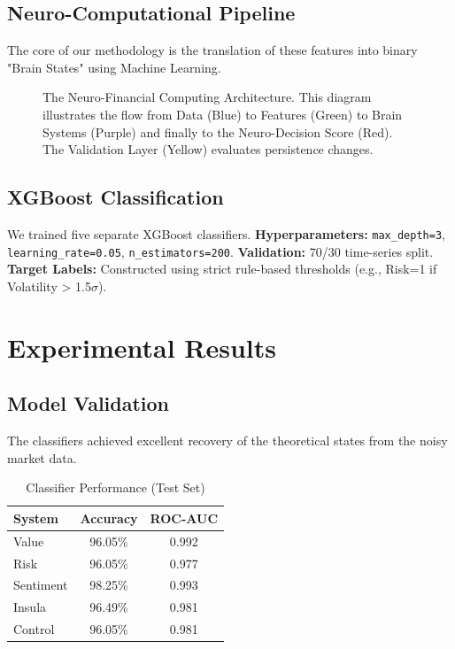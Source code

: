 \documentclass[12pt, oneside]{article}
\begin{document}
\subsection{Neuro-Computational Pipeline}
The core of our methodology is the translation of these features into binary "Brain States" using Machine Learning.

\begin{figure}[H]
\centering
\resizebox{0.9\textwidth}{!}{%
    
}
\caption{The Neuro-Financial Computing Architecture. This diagram illustrates the flow from Data (Blue) to Features (Green) to Brain Systems (Purple) and finally to the Neuro-Decision Score (Red). The Validation Layer (Yellow) evaluates persistence changes.}
\label{fig:architecture}
\end{figure}

\subsection{XGBoost Classification}
We trained five separate XGBoost classifiers.
\textbf{Hyperparameters:} \texttt{max\_depth=3}, \texttt{learning\_rate=0.05}, \texttt{n\_estimators=200}.
\textbf{Validation:} 70/30 time-series split.
\textbf{Target Labels:} Constructed using strict rule-based thresholds (e.g., Risk=1 if Volatility > 1.5$\sigma$).

\section{Experimental Results}

\subsection{Model Validation}
The classifiers achieved excellent recovery of the theoretical states from the noisy market data.
\begin{table}[H]
\centering
\caption{Classifier Performance (Test Set)}
\label{tab:performance}
\begin{tabular}{lcc}
\toprule
\textbf{System} & \textbf{Accuracy} & \textbf{ROC-AUC} \\
\midrule
Value & 96.05\% & 0.992 \\
Risk & 96.05\% & 0.977 \\
Sentiment & 98.25\% & 0.993 \\
Insula & 96.49\% & 0.981 \\
Control & 96.05\% & 0.981 \\
\bottomrule
\end{tabular}
\end{table}
\end{document}
